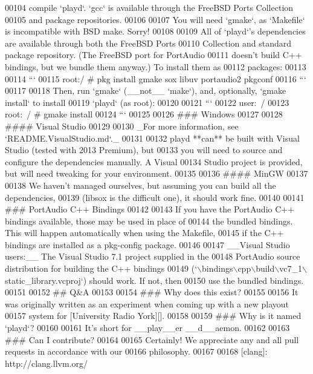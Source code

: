 \begin{DoxyCode}
00104 \textcolor{stringliteral}{compile `playd`.  `gcc` is available through the FreeBSD Ports Collection}
00105 \textcolor{stringliteral}{and package repositories.}
00106 \textcolor{stringliteral}{}
00107 \textcolor{stringliteral}{You will need `gmake`, as `Makefile` is incompatible with BSD make.  Sorry!}
00108 \textcolor{stringliteral}{}
00109 \textcolor{stringliteral}{All of `playd`'}s dependencies are available through both the FreeBSD Ports
00110 Collection and standard \textcolor{keyword}{package }repository.  (The FreeBSD port for PortAudio
00111 doesn't build C++ bindings, but we bundle them anyway.)  To install them as
00112 packages:
00113 
00114 ```
00115 root:/ # pkg install gmake sox libuv portaudio2 pkgconf
00116 ```
00117 
00118 Then, run `gmake` (\_\_not\_\_ `make`), and, optionally, `gmake install` to install
00119 `playd` (as root):
00120 
00121 ```
00122 user:~/ %
00123 root:~/ # gmake install
00124 ```
00125 
00126 ### Windows
00127 
00128 #### Visual Studio
00129 
00130 \_For more information, see `README.VisualStudio.md`.\_
00131 
00132 playd **can** be built with Visual Studio (tested with 2013 Premium), but
00133 you will need to source and configure the dependencies manually.  A Visual
00134 Studio project is provided, but will need tweaking for your environment.
00135 
00136 #### MinGW
00137 
00138 We haven't managed ourselves, but assuming you can build all the dependencies,
00139 (libsox is the difficult one), it should work fine.
00140 
00141 ### PortAudio C++ Bindings
00142 
00143 If you have the PortAudio C++ bindings available, those may be used in place of
00144 the bundled bindings.  This will happen automatically when using the Makefile,
00145 if the C++ bindings are installed as a pkg-config package.
00146 
00147 \_\_Visual Studio users:\_\_ The Visual Studio 7.1 project supplied in the
00148 PortAudio source distribution for building the C++ bindings
00149 (`\(\backslash\)bindings\(\backslash\)cpp\(\backslash\)build\(\backslash\)vc7\_1\(\backslash\)static\_library.vcproj`) should work.  If not, then
00150 use the bundled bindings.
00151 
00152 ## Q&A
00153 
00154 ### Why does this exist?
00155 
00156 It was originally written as an experiment when coming up with a new playout
00157 system for [University Radio York][].
00158 
00159 ### Why is it named `playd`?
00160 
00161 It's short for \_\_play\_\_er \_\_d\_\_aemon.
00162 
00163 ### Can I contribute?
00164 
00165 Certainly!  We appreciate any and all pull requests in accordance with our
00166 philosophy.
00167 
00168 [clang]:                 http:\textcolor{comment}{//clang.llvm.org/}

\end{DoxyCode}
